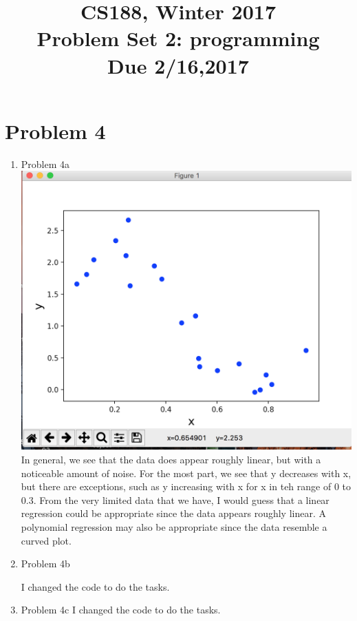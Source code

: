 \documentclass[11pt]{article}
\newcommand{\cnum}{CS188}
\newcommand{\ced}{Winter 2017}
\newcommand{\ctitle}[3]{\title{\vspace{-0.5in}\cnum, \ced\\Problem Set #1: #2\\Due #3}}
\newcommand{\solution}[1]{{{\color{blue}{\bf Solution:} {#1}}}}
\begin{document}
\ctitle{2}{programming}{2/16,2017}
\author{}
\date{}
\maketitle
\vspace{-0.75in}

\section{Problem 4}
\begin{enumerate}
\item Problem 4a
\includegraphics[scale=0.5]{ps21.png}
\solution{
In general, we see that the data does appear roughly linear, but with a noticeable amount of noise. For the most part, we see that y decreases with x, but there are exceptions, such as y increasing with x for x in teh range of 0 to 0.3. From the very limited data that we have, I would guess that a linear regression could be appropriate since the data appears roughly linear. A polynomial regression may also be appropriate since the data resemble a curved plot.
}

\vspace{1cm}
\item Problem 4b

\solution{I changed the code to do the tasks.}
\vspace{1cm}
\item Problem 4c
\solution{I changed the code to do the tasks.}
\vspace{1cm}


\end{enumerate}
\end{document}
